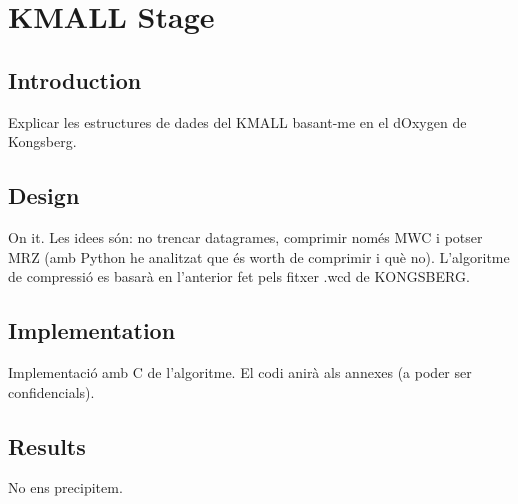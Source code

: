 \chapter{KMALL Stage}
\begin{comment}
Aquesta etapa decorreladora està enfocada a dades provinents de sondes submarines de l'empresa KONGSBERG.

La informació més interessant dels fitxers .kmall (ordre dels 100 MB) és la de les columnes d'aigua (ocupa el 99\% de la mida total del fitxer). El format d'aquests fitxers està basat en datagrames, la documentació dels quals és pública a la web de KONGSBERG (com que és un dOxygen potser ho pugem al servidor de DAPCOM, ho he de parlar amb en Jordi).

Com que FAPEC comprimeix per chunks s'ha de parar especial atenció a no partir un datagrama per la meitat o F al xat.
\end{comment}


\section{Introduction}
Explicar les estructures de dades del KMALL basant-me en el dOxygen de Kongsberg.

\section{Design}
On it. Les idees són: no trencar datagrames, comprimir només MWC i potser MRZ (amb Python he analitzat que és worth de comprimir i què no). L'algoritme de compressió es basarà en l'anterior fet pels fitxer .wcd de KONGSBERG.

\section{Implementation}
Implementació amb C de l'algoritme. El codi anirà als annexes (a poder ser confidencials).

\section{Results}
No ens precipitem.